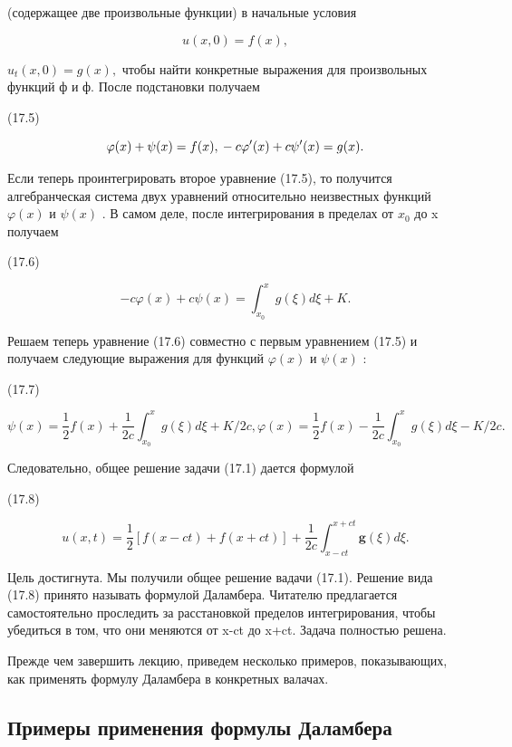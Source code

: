 \documentclass[
  ukrainian,
]{article}
\begin{document}
(содержащее две произвольные функции) в начальные условия

\[
u(x, 0) = f(x),
\]

\(u_t(x, 0) = g(x),\) чтобы найти конкретные выражения для произвольных
функций ф и ф. После подстановки получаем

(17.5)

\[
\varphi(x) + \psi(x) = f(x), \\ -c\varphi'(x) + c\psi'(x) = g(x).
\]

Если теперь проинтегрировать второе уравнение (17.5), то получится
алгебранческая система двух уравнений относительно неизвестных функций
\(\varphi(x)\) и \(\psi(x)\) . В самом деле, после интегрирования в
пределах от \(x_0\) до x получаем

(17.6)

\[
-c\varphi(x) + c\psi(x) = \int_{x_0}^{x} g(\xi) d\xi + K.
\]

Решаем теперь уравнение (17.6) совместно с первым уравнением (17.5) и
получаем следующие выражения для функций \(\varphi(x)\) и \(\psi(x)\) :

(17.7)

\[
\psi(x) = \frac{1}{2} f(x) + \frac{1}{2c} \int_{x_0}^{x} g(\xi) d\xi + K/2c,
\varphi(x) = \frac{1}{2} f(x) - \frac{1}{2c} \int_{x_0}^{x} g(\xi) d\xi - K/2c.
\]

Следовательно, общее решение задачи (17.1) дается формулой

(17.8)

\[
u(x, t) = \frac{1}{2} \left[ f(x-ct) + f(x+ct) \right] + \frac{1}{2c} \int_{x-ct}^{x+ct} \mathbf{g}(\xi) d\xi.
\]

Цель достигнута. Мы получили общее решение вадачи (17.1). Решение вида
(17.8) принято называть формулой Даламбера. Читателю предлагается
самостоятельно проследить за расстановкой пределов интегрирования, чтобы
убедиться в том, что они меняются от x-ct до x+ct. Задача полностью
решена.

Прежде чем завершить лекцию, приведем несколько примеров, показывающих,
как применять формулу Даламбера в конкретных валачах.

\subsection{Примеры применения формулы
Даламбера}\label{ux43fux440ux438ux43cux435ux440ux44b-ux43fux440ux438ux43cux435ux43dux435ux43dux438ux44f-ux444ux43eux440ux43cux443ux43bux44b-ux434ux430ux43bux430ux43cux431ux435ux440ux430}
\end{document}
